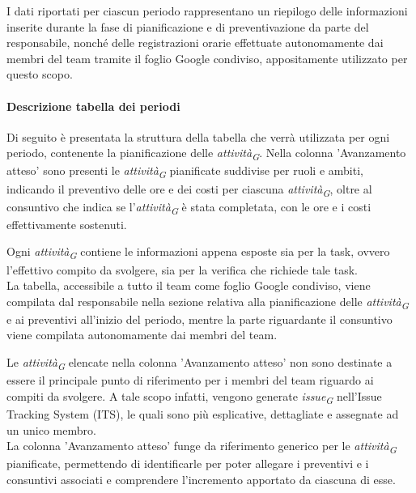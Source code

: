 \vspace{0.2cm}

I dati riportati per ciascun periodo rappresentano un riepilogo delle informazioni inserite durante la fase di pianificazione e di preventivazione da parte del responsabile, nonché delle registrazioni orarie effettuate autonomamente dai membri del team tramite il foglio Google condiviso, appositamente utilizzato per questo scopo.

\paragraph{Descrizione tabella dei periodi}\label{sec:DescrTabella}

Di seguito è presentata la struttura della tabella che verrà utilizzata per ogni periodo, contenente la pianificazione delle \textit{attività}\textsubscript{\textit{G}}. Nella colonna 'Avanzamento atteso' sono presenti le \textit{attività}\textsubscript{\textit{G}} pianificate suddivise per ruoli e ambiti, indicando il preventivo delle ore e dei costi per ciascuna \textit{attività}\textsubscript{\textit{G}}, oltre al consuntivo che indica se l'\textit{attività}\textsubscript{\textit{G}} è stata completata, con le ore e i costi effettivamente sostenuti.

\vspace{0.2cm}

Ogni \textit{attività}\textsubscript{\textit{G}} contiene le informazioni appena esposte sia per la task, ovvero l'effettivo compito da svolgere,  sia per la verifica che richiede tale task. \\
La tabella, accessibile a tutto il team come foglio Google condiviso, viene compilata dal responsabile nella sezione relativa alla pianificazione delle \textit{attività}\textsubscript{\textit{G}} e ai preventivi all'inizio del periodo, mentre la parte riguardante il consuntivo viene compilata autonomamente dai membri del team.

\vspace{0.2cm}

Le \textit{attività}\textsubscript{\textit{G}} elencate nella colonna 'Avanzamento atteso' non sono destinate a essere il principale punto di riferimento per i membri del team riguardo ai compiti da svolgere. A tale scopo infatti, vengono generate \textit{issue}\textsubscript{\textit{G}} nell'Issue Tracking System (ITS), le quali sono più esplicative, dettagliate e assegnate ad un unico membro. \\
La colonna 'Avanzamento atteso' funge da riferimento generico per le \textit{attività}\textsubscript{\textit{G}} pianificate, permettendo di identificarle per poter allegare i preventivi e i consuntivi associati e comprendere l'incremento apportato da ciascuna di esse.

